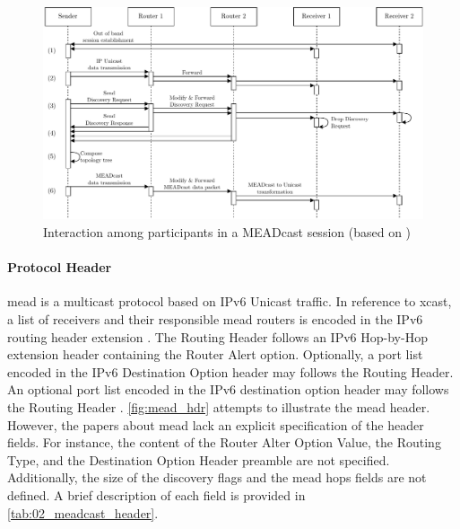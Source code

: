 \begin{figure}
    \centering
    \includegraphics[width=.95\textwidth]{Bilder/mead_seq_dia.pdf}
    \caption{Interaction among participants in a MEADcast session (based on
        \cite{meadcast2})}
    \label{fig:mead_seq_dia}
\end{figure}

\paragraph{Protocol Header} %
\label{par:Protocol Header}
\gls{mead} is a multicast protocol based on IPv6 Unicast traffic.
In reference to \gls{xcast}, a list of receivers and their responsible
    \gls{mead} routers is encoded in the IPv6 routing header extension
    \cite{meadcast2}.
The Routing Header follows an IPv6 Hop-by-Hop extension header containing the
    Router Alert option\cite{meadcast2}.
Optionally, a port list encoded in the IPv6 Destination Option header may
    follows the Routing Header.
An optional port list encoded in the IPv6 destination option header may follows
    the Routing Header \cite{meadcast2}.
\autoref{fig:mead_hdr} attempts to illustrate the \gls{mead} header.
However, the papers about \gls{mead} \cite{meadcast1, meadcast2} lack an
    explicit specification of the header fields.
For instance, the content of the Router Alter Option Value, the Routing Type,
    and the Destination Option Header preamble are not specified.
Additionally, the size of the discovery flags and the \gls{mead} hops fields
    are not defined.
A brief description of each field is provided in
\autoref{tab:02_meadcast_header}.

